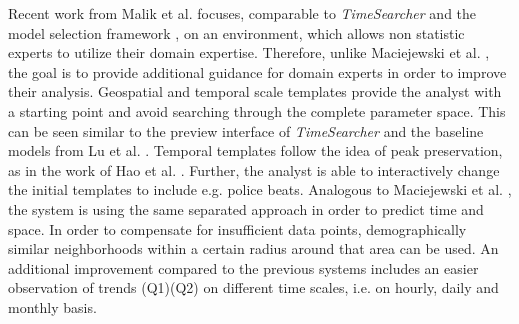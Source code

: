 \documentclass[electronic]{vgtc}             %
\begin{document}
Recent work from Malik et al. \cite{malik:2014} focuses, comparable to \textit{TimeSearcher} \cite{buono:2005} and the model selection framework \cite{lu:2014}, on an environment, which allows non statistic experts to utilize their domain expertise.
Therefore, unlike Maciejewski et al. \cite{maciejewski:2011}, the goal is to provide additional guidance for domain experts in order to improve their analysis.
Geospatial and temporal scale templates provide the analyst with a starting point and avoid searching through the complete parameter space.
This can be seen similar to the preview interface of \textit{TimeSearcher} \cite{buono:2005} and the baseline models from Lu et al. \cite{lu:2014}.
Temporal templates follow the idea of peak preservation, as in the work of Hao et al. \cite{Hao:2012}.
Further, the analyst is able to interactively change the initial templates to include e.g. police beats.
Analogous to Maciejewski et al. \cite{maciejewski:2011, maciejewski:2010}, the system is using the same separated approach in order to predict time and space.
In order to compensate for insufficient data points, demographically similar neighborhoods within a certain radius around that area can be used. 
An additional improvement compared to the previous systems includes an easier observation of trends (Q1)(Q2) on different time scales, i.e. on hourly, daily and monthly basis.
\end{document}
